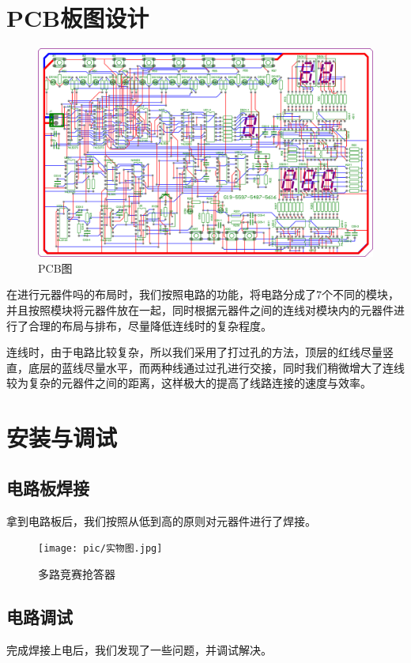 \documentclass{../source/Experiment}
\begin{document}
    \section{PCB板图设计}
            \begin{figure}[H]
                \centering
                \includegraphics[width = 1\textwidth]{pic/pcb.png}
                \caption{PCB图}
            \end{figure}
            在进行元器件吗的布局时，我们按照电路的功能，将电路分成了7个不同的模块，并且按照模块将元器件放在一起，同时根据元器件之间的连线对模块内的元器件进行了合理的布局与排布，尽量降低连线时的复杂程度。

            连线时，由于电路比较复杂，所以我们采用了打过孔的方法，顶层的红线尽量竖直，底层的蓝线尽量水平，而两种线通过过孔进行交接，同时我们稍微增大了连线较为复杂的元器件之间的距离，这样极大的提高了线路连接的速度与效率。

    \section{安装与调试}
        \subsection{电路板焊接}
            拿到电路板后，我们按照从低到高的原则对元器件进行了焊接。
            \begin{figure}[H]
                \centering
                \texttt{[image: pic/实物图.jpg]}
                \caption{多路竞赛抢答器}
            \end{figure}
        \subsection{电路调试}
            完成焊接上电后，我们发现了一些问题，并调试解决。
\end{document}
